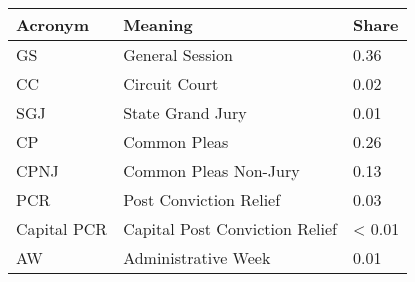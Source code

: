 \begin{tabular}{L{20mm}L{50mm}L{20mm}}
  \hline
  Acronym & Meaning & Share \\
  \hline
  GS & General Session & 0.36 \\
  CC & Circuit Court & 0.02\\
  SGJ & State Grand Jury & 0.01\\
  CP & Common Pleas & 0.26 \\
  CPNJ & Common Pleas Non-Jury & 0.13 \\
  PCR & Post Conviction Relief & 0.03  \\
  Capital PCR & Capital Post Conviction Relief & < 0.01 \\
  AW & Administrative Week & 0.01 \\
  \hline
\end{tabular}
